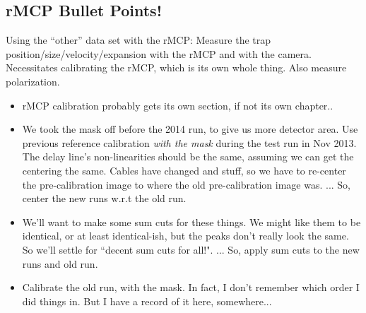 \subsection{rMCP Bullet Points!}
	Using the ``other'' data set with the rMCP:  Measure the trap position/size/velocity/expansion with the rMCP and with the camera.  Necessitates calibrating the rMCP, which is its own whole thing.  Also measure polarization.
		\begin{itemize}
		\item rMCP calibration probably gets its own section, if not its own chapter..
		\item We took the mask off before the 2014 run, to give us more detector area.  Use previous reference calibration \emph{with the mask} during the test run in Nov 2013.  The delay line's non-linearities should be the same, assuming we can get the centering the same.  Cables have changed and stuff, so we have to re-center the pre-calibration image to where the old pre-calibration image was.  ...  So, center the new runs w.r.t the old run.
		\item We'll want to make some sum cuts for these things.  We might like them to be identical, or at least identical-ish, but the peaks don't really look the same.  So we'll settle for ``decent sum cuts for all!".  ...  So, apply sum cuts to the new runs and old run.
		\item Calibrate the old run, with the mask.  In fact, I don't remember which order I did things in.  But I have a record of it here, somewhere...
		\end{itemize}



